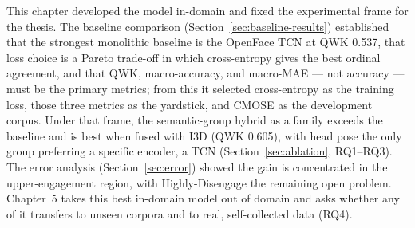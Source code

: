 \documentclass[../main.tex]{subfiles}
\begin{document}
This chapter developed the model in-domain and fixed the experimental frame for the thesis.
The baseline comparison (Section~\ref{sec:baseline-results}) established that the strongest monolithic baseline is the OpenFace TCN at QWK 0.537, that loss choice is a Pareto trade-off in which cross-entropy gives the best ordinal agreement, and that QWK, macro-accuracy, and macro-MAE --- not accuracy --- must be the primary metrics; from this it selected cross-entropy as the training loss, those three metrics as the yardstick, and CMOSE as the development corpus.
Under that frame, the semantic-group hybrid as a family exceeds the baseline and is best when fused with I3D (QWK 0.605), with head pose the only group preferring a specific encoder, a TCN (Section~\ref{sec:ablation}, RQ1--RQ3).
The error analysis (Section~\ref{sec:error}) showed the gain is concentrated in the upper-engagement region, with Highly\nobreakdash-Disengage the remaining open problem.
Chapter~5 takes this best in-domain model out of domain and asks whether any of it transfers to unseen corpora and to real, self-collected data (RQ4).
\end{document}
